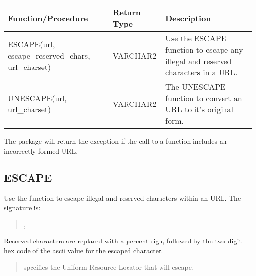 \documentclass[letterpaper,10pt,english,openany,oneside]{sphinxmanual}
\begin{document}
\begin{savenotes}\sphinxattablestart
\centering
\begin{tabulary}{\linewidth}[t]{|T|T|T|}
\hline

Function/Procedure
&
Return Type
&
Description
\\
\hline
ESCAPE(url, escape\_reserved\_chars, url\_charset)
&
VARCHAR2
&
Use the ESCAPE function to escape any illegal and reserved characters in a URL.
\\
\hline
UNESCAPE(url, url\_charset)
&
VARCHAR2
&
The UNESCAPE function to convert an URL to it’s original form.
\\
\hline
\end{tabulary}
\par
\sphinxattableend\end{savenotes}

The  package will return the  exception if the call to a
function includes an incorrectly-formed URL.


\subsection{ESCAPE}
\label{\detokenize{utl_url:escape}}
Use the  function to escape illegal and reserved characters within
an URL. The signature is:
\begin{quote}

\begin{DUlineblock}{0em}
\item[] ,
\item[]
\begin{DUlineblock}{\DUlineblockindent}
\item[] 
\end{DUlineblock}
\end{DUlineblock}
\end{quote}

Reserved characters are replaced with a percent sign, followed by the
two-digit hex code of the ascii value for the escaped character.


\begin{quote}

 specifies the Uniform Resource Locator that  will
escape.
\end{quote}
\end{document}
